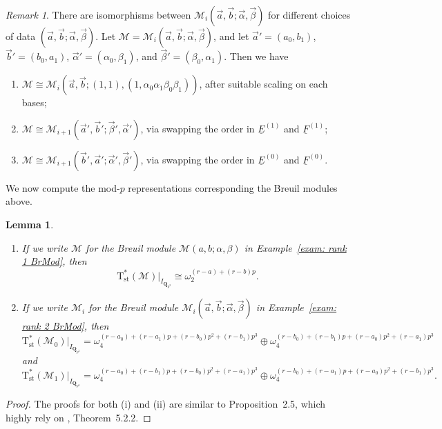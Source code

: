 \documentclass[11pt]{amsart}
\theoremstyle{definition}
\numberwithin{equation}{subsection}
\theoremstyle{plain}
\theoremstyle{plain}
\theoremstyle{plain}
\theoremstyle{plain}
\theoremstyle{plain}
\theoremstyle{plain}
\theoremstyle{plain}
\theoremstyle{plain}
\theoremstyle{plain}
\newtheorem{lemm}[equation]{Lemma}
\theoremstyle{plain}
\theoremstyle{plain}
\theoremstyle{plain}
\theoremstyle{definition}
\theoremstyle{definition}
\theoremstyle{definition}
\theoremstyle{remark}
\newtheorem{rema}[equation]{Remark}
\renewcommand{\(}{\textup{(}}
\renewcommand{\)}{\textup{)}}
\newcommand{\Q}{\mathbf{Q}}
\newcommand{\Tst}{\mathrm{T}_{\mathrm{st}}}
\newcommand{\cM}{\mathcal{M}}
\newcommand{\baseE}{\underline{E}}
\newcommand{\baseF}{\underline{F}}
\begin{document}
\begin{rema}
There are isomorphisms between $\cM_i(\vec{a},\vec{b};\vec{\alpha},\vec{\beta})$ for different choices of data $(\vec{a},\vec{b};\vec{\alpha},\vec{\beta})$. Let $\cM=\cM_i(\vec{a},\vec{b};\vec{\alpha},\vec{\beta})$, and let $\vec{a}'=(a_0,b_1)$, $\vec{b}'=(b_0,a_1)$, $\vec{\alpha}'=(\alpha_0,\beta_1)$, and $\vec{\beta}'=(\beta_0,\alpha_1)$. Then we have
\begin{enumerate}[leftmargin=*]
\item $\cM\cong\cM_i(\vec{a},\vec{b};(1,1),(1,\alpha_0\alpha_1\beta_0\beta_1))$, after suitable scaling on each bases;
\item $\cM\cong\cM_{i+1}(\vec{a}',\vec{b}';\vec{\beta}',\vec{\alpha}')$, via swapping the order in $\baseE^{(1)}$ and $\baseF^{(1)}$;
\item $\cM\cong\cM_{i+1}(\vec{b}',\vec{a}';\vec{\alpha}',\vec{\beta}')$, via swapping the order in $\baseE^{(0)}$ and $\baseF^{(0)}$.
\end{enumerate}
\end{rema}

We now compute the mod-$p$ representations corresponding the Breuil modules above.
\begin{lemm}\label{lemm: Tst^r for irred BrMod}
\begin{enumerate}[leftmargin=*]
\item If we write $\cM$ for the Breuil module $\cM(a,b;\alpha,\beta)$ in Example~\ref{exam: rank 1 BrMod}, then
    $$\Tst^\ast(\cM)|_{I_{\Q_{p^2}}} \cong \omega_2^{(r-a)+(r-b)p}.$$
\item If we write $\cM_i$ for the Breuil module $\cM_i(\vec{a},\vec{b};\vec{\alpha},\vec{\beta})$ in Example~\ref{exam: rank 2 BrMod}, then
$$\Tst^\ast(\cM_0)|_{I_{\Q_{p^2}}}=\omega_4^{(r-a_0)+(r-a_1)p+(r-b_0)p^2+(r-b_1)p^3} \oplus \omega_4^{(r-b_0)+(r-b_1)p+(r-a_0)p^2+(r-a_1)p^3}$$
and
$$\Tst^\ast(\cM_1)|_{I_{\Q_{p^2}}}=\omega_4^{(r-a_0)+(r-b_1)p+(r-b_0)p^2+(r-a_1)p^3} \oplus \omega_4^{(r-b_0)+(r-a_1)p+(r-a_0)p^2+(r-b_1)p^3}.$$
\end{enumerate}
\end{lemm}

\begin{proof}
The proofs for both (i) and (ii) are similar to \cite{Par} Proposition~2.5, which highly rely on \cite{Caruso}, Theorem~5.2.2.
\end{proof}






\smallskip
\end{document}
